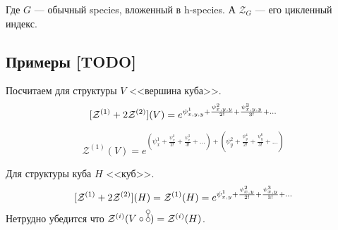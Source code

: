 Где $G$ --- обычный species, вложенный в h-species. А $\mathcal Z_G$ --- его
цикленный индекс.
 
\subsection{Примеры [TODO]}
Посчитаем для структуры $V$ <<вершина куба>>.
$$
[\mathcal Z^{(1)} + 2\mathcal Z^{(2)}](V) = e^{\psi_{x,y,y}^{1} + \frac{\psi_{x,y,y}^{2}}{2!} +
\frac{\psi_{x,y,y}^{3}}{3!} + \dots} 
$$

$$
\mathcal Z^{(1)}(V) = e^{(\psi_{x}^{1} + \frac{\psi_{x}^{2}}{2!} +
\frac{\psi_{x}^{3}}{3!} + \dots) + (\psi_{y}^{2} + \frac{\psi_{y}^{4}}{2!} +
\frac{\psi_{y}^{6}}{3!} + \dots)} 
$$

Для структуры куба $H$ <<куб>>.
$$
[\mathcal Z^{(1)} + 2\mathcal Z^{(2)}](H) = \mathcal Z^{(1)}(H) = e^{\psi_{x,y}^{1} +
\frac{\psi_{x,y}^{2}}{2!} + \frac{\psi_{x,y}^{3}}{3!} + \dots} 
$$
Нетрудно убедится что $\mathcal Z^{(i)}(V \circ \dA) = \mathcal Z^{(i)}(H)$.
